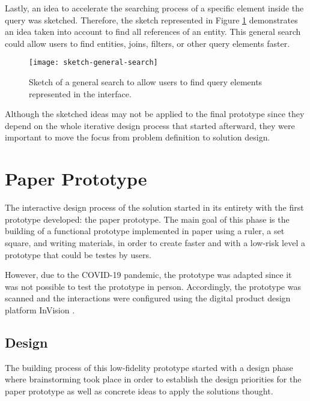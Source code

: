 Lastly, an idea to accelerate the searching process of a specific element inside the query was sketched. Therefore, the sketch represented in Figure \ref{fig:sketchGeneralSearch} demonstrates an idea taken into account to find all references of an entity. This general search could allow users to find entities, joins, filters, or other query elements faster.

\begin{figure}[htbp]
	\centering
	\texttt{[image: sketch-general-search]}
	\caption{Sketch of a general search to allow users to find query elements represented in the interface.}
	\label{fig:sketchGeneralSearch}
\end{figure}

Although the sketched ideas may not be applied to the final prototype since they depend on the whole iterative design process that started afterward, they were important to move the focus from problem definition to solution design.


\section{Paper Prototype}
\label{sec:paper_prototype}
The interactive design process of the solution started in its entirety with the first prototype developed: the paper prototype. The main goal of this phase is the building of a functional prototype implemented in paper using a ruler, a set square, and writing materials, in order to create faster and with a low-risk level a prototype that could be testes by users.

However, due to the COVID-19 pandemic, the prototype was adapted since it was not possible to test the prototype in person. Accordingly, the prototype was scanned and the interactions were configured using the digital product design platform InVision \cite{invision}.

\subsection{Design}
\label{subsec:paper_prototype_design}
The building process of this low-fidelity prototype started with a design phase where brainstorming took place in order to establish the design priorities for the paper prototype as well as concrete ideas to apply the solutions thought.

